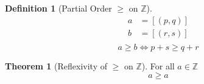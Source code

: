 \documentclass[12pt]{article}
\theoremstyle{definition}
\newtheorem{theorem}{Theorem}
\newtheorem{definition}{Definition}
\begin{document}
\begin{definition}[Partial Order $\geq$ on $\mathbb{Z}$]
    \begin{align*}
        a &= [(p, q)] \\
        b &= [(r, s)] \\
    \end{align*}
    \begin{equation*}
        a \geq b \iff p + s \geq q + r
    \end{equation*}
\end{definition}

\begin{theorem}[Reflexivity of $\geq$ on $\mathbb{Z}$]
    For all $a \in \mathbb{Z}$
    \begin{equation}
        a \geq a
    \end{equation}
\end{theorem}
\end{document}
